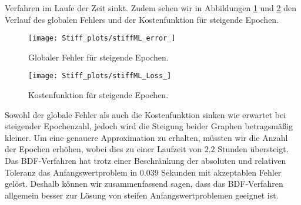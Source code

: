 Verfahren im Laufe der Zeit sinkt. Zudem sehen wir in Abbildungen \ref{fig:stiff-error} und \ref{fig:stiff-loss} den
Verlauf des globalen Fehlers und der Kostenfunktion für steigende Epochen.
\begin{figure}
       \centering
       \texttt{[image: Stiff\_plots/stiffML\_error\_]}
       \caption{Globaler Fehler für steigende Epochen.}
       \label{fig:stiff-error}
\end{figure}
\begin{figure}
       \centering
       \texttt{[image: Stiff\_plots/stiffML\_Loss\_]}
       \caption{Kostenfunktion für steigende Epochen.}
       \label{fig:stiff-loss}
\end{figure}
Sowohl der globale Fehler als auch die Kostenfunktion sinken wie erwartet bei steigender Epochenzahl, jedoch wird die
Steigung beider Graphen betragsmäßig kleiner. Um eine genauere Approximation zu erhalten, müssten wir die Anzahl der
Epochen erhöhen, wobei dies zu einer Laufzeit von $2.2$ Stunden übersteigt. Das BDF-Verfahren hat trotz einer
Beschränkung der absoluten und relativen Toleranz das Anfangswertproblem in $0.039$ Sekunden mit akzeptablen
Fehler gelöst. Deshalb können wir zusammenfassend sagen, dass das BDF-Verfahren allgemein besser zur Lösung
von steifen Anfangswertproblemen geeignet ist.

